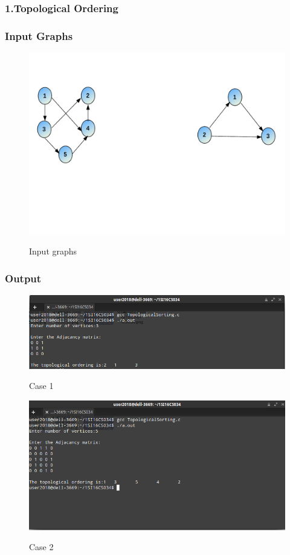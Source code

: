 \documentclass[12pt, a4paper]{article}
\begin{document}
\subsubsection*{1.Topological Ordering}

\subsubsection*{Input Graphs}
\begin{figure}[h]
\centering
\includegraphics[width=3.5 in,height=2 in]{./Output/TopologicalSortIn.png}
\label{Figure 2}
\caption{Input graphs}
\end{figure}
\newpage
\subsubsection*{Output}
\begin{figure}[h]
\centering
\includegraphics[width=5 in,height=2.5 in]{./Output/im9.png}
\label{Figure 2}
\caption{Case 1}
\end{figure}
\begin{figure}[h]
\centering
\includegraphics[width=5 in,height=2.5 in]{./Output/im10.png}
\label{Figure 3}
\caption{Case 2}
\end{figure}
\newpage
\end{document}
